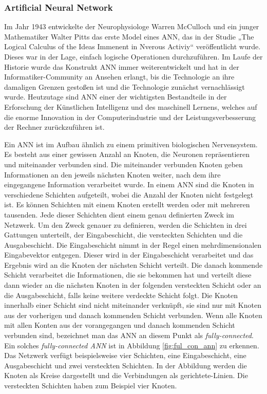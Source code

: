 \subsubsection{Artificial Neural Network}
Im Jahr 1943 entwickelte der Neurophysiologe Warren McCulloch und ein junger Mathematiker Walter Pitts das erste Model eines ANN, das in der Studie „The Logical Calculus of the Ideas Immenent in Nverous Activiy“ veröffentlicht wurde. Dieses war in der Lage, einfach logische Operationen durchzuführen.
Im Laufe der Historie wurde das Konstrukt ANN immer weiterentwickelt und hat in der Informatiker-Community an Ansehen erlangt, bis die Technologie an ihre damaligen Grenzen gestoßen ist und die Technologie zunächst vernachlässigt wurde.
Heutzutage sind ANN einer der wichtigsten Bestandteile in der Erforschung der Künstlichen Intelligenz und des maschinell Lernens, welches auf die enorme Innovation in der Computerindustrie und der Leistungsverbesserung der Rechner zurückzuführen ist. \cite*{10.1007/978-3-319-45378-1_1}

Ein ANN ist im Aufbau ähnlich zu einem primitiven biologischen Nervensystem. Es besteht aus einer gewissen Anzahl an Knoten, die Neuronen repräsentieren und miteinander verbunden sind. Die miteinander verbunden Knoten geben Informationen an den jeweils nächsten Knoten weiter, nach dem ihre eingegangene Information verarbeitet wurde.
In einem ANN sind die Knoten in verschiedene Schichten aufgeteilt, wobei die Anzahl der Knoten nicht festgelegt ist. Es können Schichten mit einem Knoten erstellt werden oder mit mehreren tausenden. Jede dieser Schichten dient einem genau definierten Zweck im Netzwerk. Um den Zweck genauer zu definieren, werden die Schichten in drei Gattungen unterteilt, der Eingabeschicht, die versteckten Schichten und die Ausgabeschicht. Die Eingabeschicht nimmt in der Regel einen mehrdimensionalen Eingabevektor entgegen. Dieser wird in der Eingabeschicht verarbeitet und das Ergebnis wird an die Knoten der nächsten Schicht verteilt. Die danach kommende Schicht verarbeitet die Informationen, die sie bekommen hat und verteilt diese dann wieder an die nächsten Knoten in der folgenden versteckten Schicht oder an die Ausgabeschicht, falls keine weitere verdeckte Schicht folgt.
Die Knoten innerhalb einer Schicht sind nicht miteinander verknüpft, sie sind nur mit Knoten aus der vorherigen und danach kommenden Schicht verbunden. Wenn alle Knoten mit allen Konten aus der vorangegangen und danach kommenden Schicht verbunden sind, bezeichnet man das ANN an diesem Punkt als \textit{fully-connected}. Ein solches \textit{fully-connected ANN} ist in Abbildung \ref{fig:ful_con_ann} zu erkennen. Das Netzwerk verfügt beispielsweise vier Schichten, eine Eingabeschicht, eine Ausgabeschicht und zwei versteckten Schichten. In der Abbildung werden die Knoten als Kreise dargestellt und die Verbindungen als gerichtete-Linien. Die versteckten Schichten haben zum Beispiel vier Knoten.
\cite*{Keiron2015}

